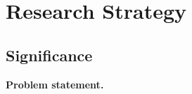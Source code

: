 \documentclass[12pt, class=article, crop=false]{standalone}
\begin{document}
\section*{Research Strategy}

\subsection*{Significance}


\textbf{Problem statement.}
\end{document}
